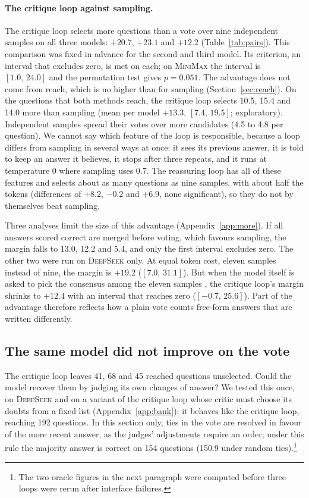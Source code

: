 \documentclass[11pt]{article}
\newcommand{\ds}{\textsc{DeepSeek}}
\newcommand{\mm}{\textsc{MiniMax}}
\newcommand{\ci}[2]{$[#1,\,#2]$}
\begin{document}
\paragraph{The critique loop against sampling.}
The critique loop selects more questions than a vote over nine independent samples on all three models: $+20.7$, $+23.1$ and $+12.2$ (Table~\ref{tab:pairs}).
This comparison was fixed in advance for the second and third model.
Its criterion, an interval that excludes zero, is met on each; on \mm{} the interval is \ci{1.0}{24.0} and the permutation test gives $p=0.051$.
The advantage does not come from reach, which is no higher than for sampling (Section~\ref{sec:reach}).
On the questions that both methods reach, the critique loop selects 10.5, 15.4 and 14.0 more than sampling (mean per model $+13.3$, \ci{7.4}{19.5}; exploratory).
Independent samples spread their votes over more candidates (4.5 to 4.8 per question).
We cannot say which feature of the loop is responsible, because a loop differs from sampling in several ways at once: it sees its previous answer, it is told to keep an answer it believes, it stops after three repeats, and it runs at temperature 0 where sampling uses 0.7.
The reassuring loop has all of these features and selects about as many questions as nine samples, with about half the tokens (differences of $+8.2$, $-0.2$ and $+6.9$, none significant), so they do not by themselves beat sampling.

Three analyses limit the size of this advantage (Appendix~\ref{app:more}).
If all answers scored correct are merged before voting, which favours sampling, the margin falls to 13.0, 12.2 and 5.4, and only the first interval excludes zero.
The other two were run on \ds{} only.
At equal token cost, eleven samples instead of nine, the margin is $+19.2$ (\ci{7.0}{31.1}).
But when the model itself is asked to pick the consensus among the eleven samples \citep{chen2023usc}, the critique loop's margin shrinks to $+12.4$ with an interval that reaches zero (\ci{-0.7}{25.6}).
Part of the advantage therefore reflects how a plain vote counts free-form answers that are written differently.

\subsection{The same model did not improve on the vote}
\label{sec:judges}

The critique loop leaves 41, 68 and 45 reached questions unselected.
Could the model recover them by judging its own changes of answer?
We tested this once, on \ds{} and on a variant of the critique loop whose critic must choose its doubts from a fixed list (Appendix~\ref{app:bank}); it behaves like the critique loop, reaching 192 questions.
In this section only, ties in the vote are resolved in favour of the more recent answer, as the judges' adjustments require an order; under this rule the majority answer is correct on 154 questions (150.9 under random ties).\footnote{The two oracle figures in the next paragraph were computed before three loops were rerun after interface failures.}
\end{document}
